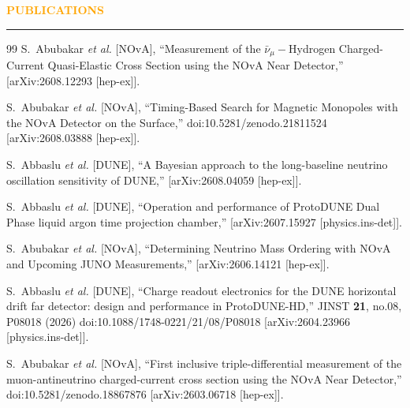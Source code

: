 \documentclass{resume} %
\renewenvironment{rSection}[1]{
\sectionskip
\textcolor{Orange}{\bfseries\MakeUppercase{#1}}
\sectionlineskip
\hrule
\begin{list}{}{
\setlength{\leftmargin}{1.5em}
}
\item[]
}{
\end{list}
}
\begin{document}
\begin{rSection}{ Publications}
\renewcommand{\refname}{} %
\vspace{-2.5em} %
\begin{thebibliography}{99}
S.~Abubakar \textit{et al.} [NOvA],
``Measurement of the $\bar ν_μ-$Hydrogen Charged-Current Quasi-Elastic Cross Section using the NOvA Near Detector,''
[arXiv:2608.12293 [hep-ex]].

S.~Abubakar \textit{et al.} [NOvA],
``Timing-Based Search for Magnetic Monopoles with the NOvA Detector on the Surface,''
doi:10.5281/zenodo.21811524
[arXiv:2608.03888 [hep-ex]].

S.~Abbaslu \textit{et al.} [DUNE],
``A Bayesian approach to the long-baseline neutrino oscillation sensitivity of DUNE,''
[arXiv:2608.04059 [hep-ex]].

S.~Abbaslu \textit{et al.} [DUNE],
``Operation and performance of ProtoDUNE Dual Phase liquid argon time projection chamber,''
[arXiv:2607.15927 [physics.ins-det]].

S.~Abubakar \textit{et al.} [NOvA],
``Determining Neutrino Mass Ordering with NOvA and Upcoming JUNO Measurements,''
[arXiv:2606.14121 [hep-ex]].

S.~Abbaslu \textit{et al.} [DUNE],
``Charge readout electronics for the DUNE horizontal drift far detector: design and performance in ProtoDUNE-HD,''
JINST \textbf{21}, no.08, P08018 (2026)
doi:10.1088/1748-0221/21/08/P08018
[arXiv:2604.23966 [physics.ins-det]].

S.~Abubakar \textit{et al.} [NOvA],
``First inclusive triple-differential measurement of the muon-antineutrino charged-current cross section using the NOvA Near Detector,''
doi:10.5281/zenodo.18867876
[arXiv:2603.06718 [hep-ex]].


\end{thebibliography}
\end{rSection}
\end{document}
